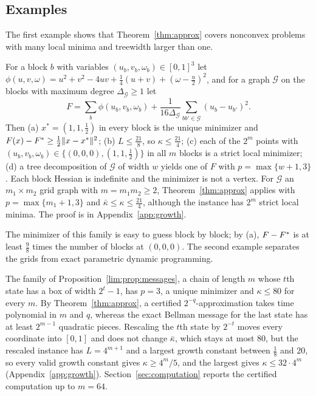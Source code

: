 

\subsection{Examples}
The first example shows that Theorem~\ref{thm:approx} covers nonconvex
problems with many local minima and treewidth larger than one.

\begin{example}\label{ex:family}
For a block $b$ with variables $(u_b,v_b,\omega_b)\in[0,1]^3$ let
$\phi(u,v,\omega)=u^2+v^2-4uv+\frac14(u+v)+(\omega-\frac u2)^2$, and for a graph
$\mathcal G$ on the blocks with maximum degree $\Delta_{\mathcal G}\ge1$ let
\[
F=\sum_b\phi(u_b,v_b,\omega_b)+\frac1{16\Delta_{\mathcal G}}
\sum_{bb'\in\mathcal G}(u_b-u_{b'})^2 .
\]
Then (a) $x^*=(1,1,\frac12)$ in every block is the unique minimizer and
$F(x)-F^{*}\ge\frac12\lVert x-x^*\rVert^2$; (b) $L\le\frac{21}8$, so
$\kappa\le\frac{21}4$; (c) each of the $2^m$ points with
$(u_b,v_b,\omega_b)\in\{(0,0,0),(1,1,\frac12)\}$ in all $m$ blocks is a strict
local minimizer; (d) a tree decomposition of $\mathcal G$ of width $w$ yields
one of $F$ with $p=\max\{w+1,3\}$. Each block Hessian is indefinite and the
minimizer is not a vertex. For $\mathcal G$ an $m_1\times m_2$ grid graph
with $m=m_1m_2\ge2$, Theorem~\ref{thm:approx} applies with $p=\max\{m_1+1,3\}$ and
$\bar\kappa\le\kappa\le\frac{21}4$, although the instance has $2^m$ strict
local minima. The proof is in Appendix~\ref{app:growth}.
\end{example}

The minimizer of this family is easy to guess block by block; by (a),
$F-F^{*}$ is at least $\frac98$ times the number of blocks at $(0,0,0)$. The
second example separates the grids from exact parametric dynamic
programming.

\begin{example}\label{ex:chain}
The family of Proposition~\ref{lim:prop:messages}, a chain of length $m$
whose $t$th state has a box of width $2^t-1$, has $p=3$, a unique minimizer
and $\kappa\le80$ for every $m$. By Theorem~\ref{thm:approx}, a certified
$2^{-q}$-approximation takes time polynomial in $m$ and $q$, whereas the
exact Bellman message for the last state has at least $2^{m-1}$ quadratic
pieces. Rescaling the $t$th state by $2^{-t}$ moves every coordinate into
$[0,1]$ and does not change $\bar\kappa$, which stays at most $80$, but the
rescaled instance has $L=4^{m+1}$ and a largest growth constant between
$\frac18$ and $20$, so every valid growth constant gives $\kappa\ge4^m/5$,
and the largest gives $\kappa\le32\cdot4^m$ (Appendix~\ref{app:growth}).
Section~\ref{sec:computation} reports the certified computation up to
$m=64$.
\end{example}

